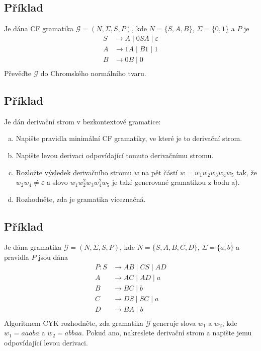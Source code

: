 \subsection{Příklad}
Je dána CF gramatika $\mathcal{G} = (N, \Sigma, S, P)$, kde $N = \{S,A,B\}$, $\Sigma = \{0,1\}$ a $P$ je
\begin{align*}
    S & \rightarrow A \mid 0SA \mid \varepsilon \\
    A & \rightarrow 1A \mid B1 \mid 1 \\
    B & \rightarrow 0B \mid 0 \\ 
\end{align*}
Převěďte $\mathcal{G}$ do Chromského normálního tvaru.

\subsection{Příklad}
Je dán derivační strom v bezkontextové gramatice:

\begin{enumerate}[a), noitemsep]
    \item Napište pravidla minimální CF gramatiky, ve které je to derivační strom.
    \item Napište levou derivaci odpovídající tomuto derivačnímu stromu.
    \item Rozložte výsledek derivačního stromu $w$ na pět částí $w = w_1 w_2 w_3 w_4 w_5$ tak, že $w_2 w_4 \not= \varepsilon$ a slovo $w_1 w_2^2 w_3 w_4^2 w_5$ je také generované gramatikou z bodu a).
    \item Rozhodněte, zda je gramatika víceznačná.
\end{enumerate}

\subsection{Příklad}
Je dána gramatika $\mathcal{G} = (N, \Sigma, S, P)$, kde $N = \{S,A,B,C,D\}$, $\Sigma = \{a,b\}$ a pravidla $P$ jsou dána
\begin{align*}
  P:  S & \rightarrow AB \mid CS \mid AD \\
    A & \rightarrow AC \mid AD \mid a \\
    B & \rightarrow BC \mid b \\ 
    C & \rightarrow DS \mid SC \mid a \\
    D & \rightarrow BA \mid b \\
\end{align*}
Algoritmem CYK rozhodněte, zda gramatika $\mathcal{G}$ generuje slova $w_1$ a $w_2$, kde $w_1 = aaaba$ a $w_2 = abbaa$. Pokud ano, nakreslete derivační strom a napište jemu odpovídající levou derivaci.

